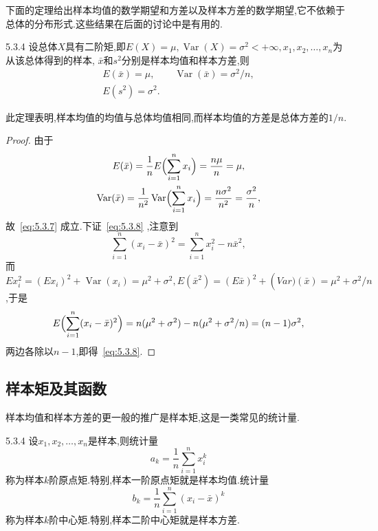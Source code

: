 下面的定理给出样本均值的数学期望和方差以及样本方差的数学期望,它不依赖于总体的分布形式.这些结果在后面的讨论中是有用的.
\begin{theorem}{}{5.3.4}
设总体$X$具有二阶矩,即$E(X)=\mu,\operatorname{Var}(X)=\sigma^2<+\infty,x_1,x_2,\dotsc,x_n$为从该总体得到的样本, $\bar x$和$s^2$分别是样本均值和样本方差,则
\begin{gather}
E(\bar x)=\mu,\qquad\operatorname{Var}(\bar x)=\sigma^2/n,\label{eq:5.3.7}\\
E(s^2)=\sigma^2.\label{eq:5.3.8}
\end{gather}
\end{theorem}
此定理表明,样本均值的均值与总体均值相同,而样本均值的方差是总体方差的$1/n$.
\begin{proof}
由于
\begin{gather*}
E(\bar x)=\frac1nE\Bigl(\sum_{i=1}^nx_i\Bigr)=\frac{n\mu}n=\mu,\\
\operatorname{Var}(\bar x)=\frac1{n^2}\operatorname{Var}\Bigl(\sum_{i=1}^nx_i\Bigr)
=\frac{n\sigma^2}{n^2}=\frac{\sigma^2}n,
\end{gather*}
故~\eqref{eq:5.3.7} 成立.下证~\ref{eq:5.3.8} ,注意到
\[\sum_{i=1}^n(x_i-\bar x)^2=\sum_{i=1}^nx_i^2-n\bar x^2,\]
而$Ex_i^2=(Ex_i)^2+\operatorname{Var}(x_i)=\mu^2+\sigma^2,E(\bar x^2)=(E\bar x)^2+\operatorname(Var)(\bar x)=\mu^2+\sigma^2/n$,于是
\[E\Bigl(\sum_{i=1}^n(x_i-\bar x)^2\Bigr)=n(\mu^2+\sigma^2)-n(\mu^2+\sigma^2/n)=(n-1)\sigma^2,\]
两边各除以$n-1$,即得~\eqref{eq:5.3.8}.
\end{proof}
\subsection{样本矩及其函数\label{ssec:5.3.4}}
样本均值和样本方差的更一般的推广是样本矩,这是一类常见的统计量.
\begin{definition}{}{5.3.4}
设$x_1,x_2,\dotsc,x_n$是样本,则统计量
\begin{equation}\label{eq:5.3.9}
a_k=\frac1n\sum_{i=1}^nx_i^k
\end{equation}
称为样本$k$阶原点矩.特别,样本一阶原点矩就是样本均值.统计量
\begin{equation}\label{eq:5.3.10}
b_k=\frac1n\sum_{i=1}^n(x_i-\bar x)^k
\end{equation}
称为样本$k$阶中心矩.特别,样本二阶中心矩就是样本方差.
\end{definition}

